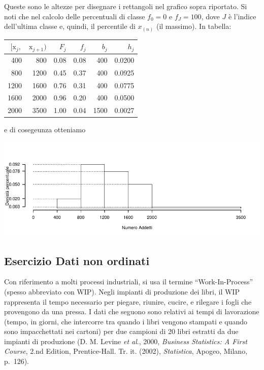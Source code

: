 \documentclass[
  11pt,
]{book}
\theoremstyle{mytheoremstyle}
\theoremstyle{mydefstyle}
\newenvironment{sol}
  {
  \begin{tcolorbox}[enhanced,breakable,arc=0.1mm,boxrule=1pt,colback=white,colframe=iblue,
  title=\bf \fontfamily{lmss}\selectfont \hspace{.5 cm} Soluzione,drop fuzzy shadow]

}{
\end{tcolorbox}
  }
\begin{document}
\begin{sol}
Queste sono le altezze per disegnare i rettangoli nel grafico
sopra riportato.
Si noti che nel calcolo delle percentuali di classe \(f_{0}=0\)
e \(f_{J}=100\), dove \(J\) è l'indice dell'ultima classe e,
quindi, il percentile di \(x_{(n)}\) (il massimo).
In tabella:

\begin{table}[H]
\centering
\begin{tabular}{rrrrrr}
\toprule
$[\text{x}_j,$ & $\text{x}_{j+1})$ & $F_j$ & $f_j$ & $b_j$ & $h_j$\\
\midrule
400 & 800 & 0.08 & 0.08 & 400 & 0.0200\\
800 & 1200 & 0.45 & 0.37 & 400 & 0.0925\\
1200 & 1600 & 0.76 & 0.31 & 400 & 0.0775\\
1600 & 2000 & 0.96 & 0.20 & 400 & 0.0500\\
2000 & 3500 & 1.00 & 0.04 & 1500 & 0.0027\\
\bottomrule
\end{tabular}
\end{table}

e di cosegeunza otteniamo

\begin{center}\includegraphics{Esami_passati_con_soluzioni_files/figure-latex/01-descr-23-1} \end{center}

\end{sol}

\subsection{Esercizio Dati non ordinati}\label{esercizio-dati-non-ordinati}

Con riferimento a molti processi industriali, si usa il
termine ``Work-In-Process'' (spesso abbreviato con WIP).
Negli impianti di produzione dei libri, il WIP rappresenta
il tempo necessario per piegare, riunire, cucire, e rilegare
i fogli che provengono da una pressa.
I dati che seguono sono relativi ai tempi di lavorazione
(tempo, in giorni, che intercorre tra quando i libri vengono
stampati e quando sono impacchettati nei cartoni) per due
campioni di 20 libri estratti da due impianti di produzione
(D. M. Levine \emph{et al}., 2000, \emph{Business Statistics:
A First Course}, 2.nd Edition, Prentice-Hall. Tr. it. (2002),
\emph{Statistica}, Apogeo, Milano, p.~126).
\end{document}
